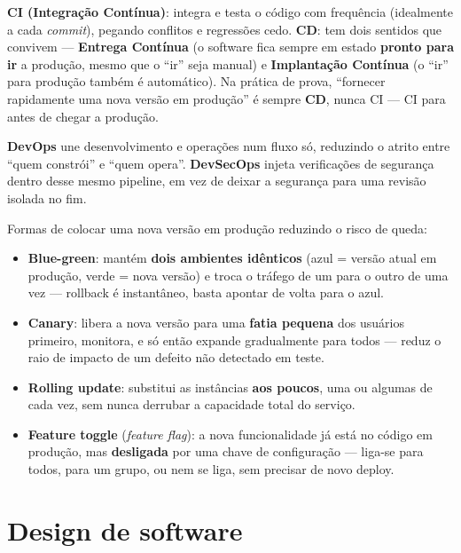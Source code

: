 \begin{conceito}[CI, CD e DevOps]
\textbf{CI (Integração Contínua)}: integra e testa o código com frequência
(idealmente a cada \textit{commit}), pegando conflitos e regressões cedo.
\textbf{CD}: tem dois sentidos que convivem --- \textbf{Entrega Contínua}
(o software fica sempre em estado \textbf{pronto para ir} a produção,
mesmo que o “ir” seja manual) e \textbf{Implantação Contínua} (o “ir” para
produção também é automático). Na prática de prova, “fornecer rapidamente
uma nova versão em produção” é sempre \textbf{CD}, nunca CI --- CI para
antes de chegar a produção.

\textbf{DevOps} une desenvolvimento e operações num fluxo só, reduzindo o
atrito entre “quem constrói” e “quem opera”. \textbf{DevSecOps} injeta
verificações de segurança dentro desse mesmo pipeline, em vez de deixar a
segurança para uma revisão isolada no fim.
\end{conceito}

\begin{conceito}
Formas de colocar uma nova versão em produção reduzindo o risco de queda:

\begin{itemize}
\item \textbf{Blue-green}: mantém \textbf{dois ambientes idênticos}
(azul = versão atual em produção, verde = nova versão) e troca o tráfego de
um para o outro de uma vez --- rollback é instantâneo, basta apontar de
volta para o azul.
\item \textbf{Canary}: libera a nova versão para uma \textbf{fatia pequena}
dos usuários primeiro, monitora, e só então expande gradualmente para
todos --- reduz o raio de impacto de um defeito não detectado em teste.
\item \textbf{Rolling update}: substitui as instâncias \textbf{aos poucos},
uma ou algumas de cada vez, sem nunca derrubar a capacidade total do
serviço.
\item \textbf{Feature toggle} (\textit{feature flag}): a nova
funcionalidade já está no código em produção, mas \textbf{desligada} por
uma chave de configuração --- liga-se para todos, para um grupo, ou nem se
liga, sem precisar de novo deploy.
\end{itemize}
\end{conceito}

\section{Design de software}

